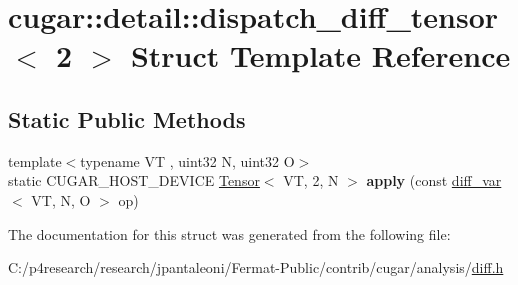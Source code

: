 \hypertarget{structcugar_1_1detail_1_1dispatch__diff__tensor_3_012_01_4}{}\section{cugar\+:\+:detail\+:\+:dispatch\+\_\+diff\+\_\+tensor$<$ 2 $>$ Struct Template Reference}
\label{structcugar_1_1detail_1_1dispatch__diff__tensor_3_012_01_4}
\subsection*{Static Public Methods}
\begin{DoxyCompactItemize}
\item 
\mbox{\label{structcugar_1_1detail_1_1dispatch__diff__tensor_3_012_01_4_afc951565d85152ba5bc4a64a762c3d67}} 
{\footnotesize template$<$typename VT , uint32 N, uint32 O$>$ }\\static C\+U\+G\+A\+R\+\_\+\+H\+O\+S\+T\+\_\+\+D\+E\+V\+I\+CE \hyperlink{structcugar_1_1_tensor}{Tensor}$<$ VT, 2, N $>$ {\bfseries apply} (const \hyperlink{structcugar_1_1diff__var}{diff\+\_\+var}$<$ VT, N, O $>$ op)
\end{DoxyCompactItemize}


The documentation for this struct was generated from the following file\+:\begin{DoxyCompactItemize}
\item 
C\+:/p4research/research/jpantaleoni/\+Fermat-\/\+Public/contrib/cugar/analysis/\hyperlink{diff_8h}{diff.\+h}\end{DoxyCompactItemize}
